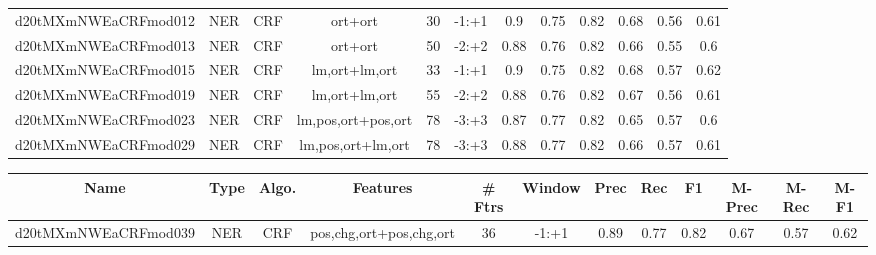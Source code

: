 \documentclass[a4paper]{article}
\begin{document}
\begin{landscape}
\begin{center}
\begin{tabular}{ |c|c|c|c|c|c|c|c|c|c|c|c|}
 	
 
 	
 		
 		\small{ d20tMXmNWEaCRFmod012 } & NER & CRF & ort+ort  &  30 &  -1:+1  &  0.9 & 0.75 & 0.82  &  0.68 & 0.56 & 0.61 \\
 		

 	
 
 	
 		
 		\small{ d20tMXmNWEaCRFmod013 } & NER & CRF & ort+ort  &  50 &  -2:+2  &  0.88 & 0.76 & 0.82  &  0.66 & 0.55 & 0.6 \\
 		

 	
 
 	
 		
 		\small{ d20tMXmNWEaCRFmod015 } & NER & CRF & lm,ort+lm,ort  &  33 &  -1:+1  &  0.9 & 0.75 & 0.82  &  0.68 & 0.57 & 0.62 \\
 		

 	
 
 	
 		
 		\small{ d20tMXmNWEaCRFmod019 } & NER & CRF & lm,ort+lm,ort  &  55 &  -2:+2  &  0.88 & 0.76 & 0.82  &  0.67 & 0.56 & 0.61 \\
 		

 	
 
 	
 		
 		\small{ d20tMXmNWEaCRFmod023 } & NER & CRF & lm,pos,ort+pos,ort  &  78 &  -3:+3  &  0.87 & 0.77 & 0.82  &  0.65 & 0.57 & 0.6 \\
 		

 	
 
 	
 		
 		\small{ d20tMXmNWEaCRFmod029 } & NER & CRF & lm,pos,ort+lm,ort  &  78 &  -3:+3  &  0.88 & 0.77 & 0.82  &  0.66 & 0.57 & 0.61 \\
 		
 \hline
\end{tabular}
\end{center}




\begin{center}
\begin{tabular}{ |c|c|c|c|c|c|c|c|c|c|c|c|} 
 \hline
 	Name & Type & Algo. & Features & \# Ftrs & Window & Prec & Rec & F1 & M-Prec & M-Rec & M-F1\\
 \hline

 		

 	
 
 	
 		
 		\small{ d20tMXmNWEaCRFmod039 } & NER & CRF & pos,chg,ort+pos,chg,ort  &  36 &  -1:+1  &  0.89 & 0.77 & 0.82  &  0.67 & 0.57 & 0.62 \\
 		


\end{tabular}
\end{center}
\end{landscape}
\end{document}
